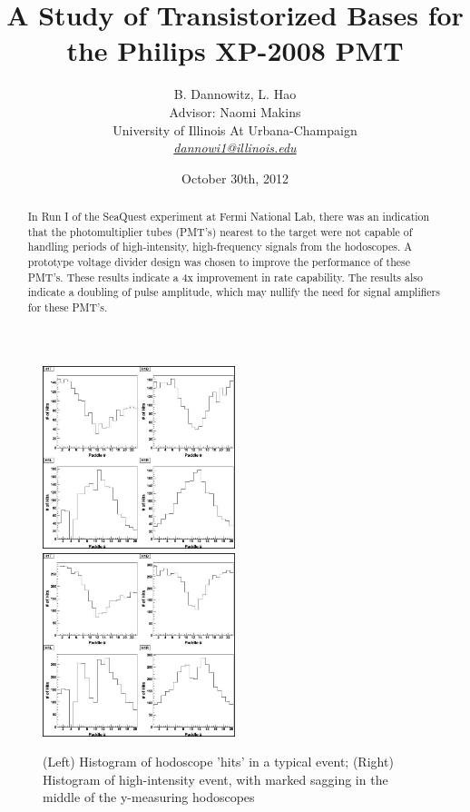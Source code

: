 \documentclass[11pt]{article}
\title{{\Large \textbf A Study of Transistorized Bases for the Philips XP-2008 PMT}}%
\author{B. Dannowitz, L. Hao\\%
  Advisor: Naomi Makins\\%
  University of Illinois At Urbana-Champaign\\%
  \href{mailto:dannowi1@illinois.edu}{\emph{dannowi1@illinois.edu}}}
\date{\normalsize{October 30th, 2012}}
\begin{document}
  \maketitle
  \begin{abstract}
In Run I of the SeaQuest experiment at Fermi National Lab, there was an indication that the photomultiplier tubes (PMT's) nearest to the target were not capable of handling periods of high-intensity, high-frequency signals from the hodoscopes. A prototype voltage divider design was chosen to improve the performance of these PMT's. These results indicate a 4x improvement in rate capability. The results also indicate a doubling of pulse amplitude, which may nullify the need for signal amplifiers for these PMT's.
  \end{abstract}

\thispagestyle{empty} 

\newpage

\tableofcontents

\newpage

\begin{figure}
    \centerline{
    \mbox{\includegraphics[width=0.5\textwidth]{nosag.jpg} \includegraphics[width=0.5\textwidth]{sag.jpg}}
    }
    \caption{(Left) Histogram of hodoscope 'hits' in a typical event; (Right) Histogram of high-intensity event, with marked sagging in the middle of the y-measuring hodoscopes \cite{elogevidence}}
    \label{fig:sag}
\end{figure}
\end{document}
